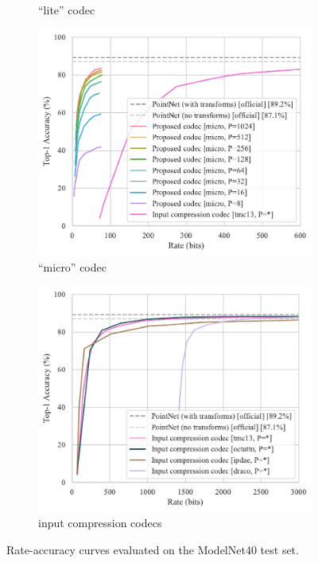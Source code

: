 \begin{figure}[htbp]
\begin{subfigure}[b]{\subfigurehspace}
    \caption{``lite'' codec}
    \label{fig:rate-accuracy/lite}
  \end{subfigure}%
  \hfill%
  \begin{subfigure}[b]{\subfigurehspace}
    \centering
    \includegraphics[width=\linewidth]{img/point_cloud_compression/rate_accuracy/modelnet40_micro.pdf}
    \caption{``micro'' codec}
    \label{fig:rate-accuracy/micro}
  \end{subfigure}%
  \hfill%
  \begin{subfigure}[b]{\subfigurehspace}
    \centering
    \includegraphics[width=\linewidth]{img/point_cloud_compression/rate_accuracy/modelnet40_input-compression.pdf}
    \caption{input compression codecs}
    \label{fig:rate-accuracy/input-compression}
  \end{subfigure}%
  \caption{Rate-accuracy curves evaluated on the ModelNet40 test set.}
  \label{fig:rate-accuracy}
\end{figure}


